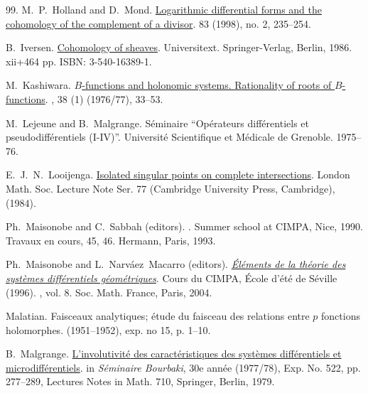 \documentclass[12pt]{article}
\begin{document}
\begin{thebibliography}{99.}
M.~P.~Holland and D.~Mond.
\newblock \href{https://doi.org/10.7146/math.scand.a-13853}{Logarithmic differential forms and the cohomology of the complement of a divisor}.
 83 (1998), no. 2, 235--254.

B.~Iversen.
\newblock \href{https://doi.org/10.1007/978-3-642-82783-9}{Cohomology of sheaves}.
\newblock Universitext. Springer-Verlag, Berlin, 1986. xii+464 pp. ISBN: 3-540-16389-1.

 {M.~Kashiwara}.
\newblock \href{https://doi.org/10.1007/BF01390168}{{$B$}-functions and holonomic systems. {R}ationality of roots of {$B$}-functions}.
,  {38} (1) (1976/77), {33--53}.


 M.~Lejeune and B.~Malgrange.
\newblock Séminaire ``Op\'erateurs diff\'erentiels et pseudodiff\'erentiels (I-IV)''.
\newblock Universit\'e Scientifique et M\'edicale de Grenoble. 1975--76.

 E.~J.~N.~Looijenga.
\newblock \href{https://doi.org/10.1017/CBO9780511662720}{Isolated singular points on complete intersections}.
\newblock London Math. Soc. Lecture Note Ser.  77 (Cambridge University Press, Cambridge), (1984).

Ph.~Maisonobe and C.~Sabbah (editors).
.
\newblock Summer school at CIMPA, Nice, 1990.
\newblock  Travaux en cours, 45, 46.
\newblock Hermann, Paris, 1993.

Ph.~Maisonobe and L.~Narv{\'a}ez~Macarro (editors).
\newblock \href{https://smf.emath.fr/publications/elements-de-la-theorie-des-systemes-differentiels-geometriques-cours-du-cimpa-ecole}{\em \'El\'ements de la th\'eorie des syst\`emes diff\'erentiels
  g\'eom\'etriques}.
\newblock Cours du CIMPA, \'Ecole d'\'et\'e de S\'eville (1996).
, vol. 8.
\newblock Soc. Math. France, Paris, 2004.


Malatian.
\newblock Faisceaux analytiques; {\'e}tude du faisceau des relations
entre $p$ fonctions holomorphes.
 (1951--1952), exp. no 15, p. 1--10.

 B.~Malgrange.
\newblock \href{https://doi.org/10.1007/BFb0069985}{L'involutivit{\'e} des caract{\'e}ristiques des syst{\`e}mes diff{\'e}rentiels et microdiff{\'e}rentiels}.
\newblock in {\em S{\'e}minaire Bourbaki}, 30e année (1977/78), Exp. No. 522, pp. 277–289, Lectures Notes in Math. 710, Springer, Berlin, 1979.



\end{thebibliography}
\end{document}
